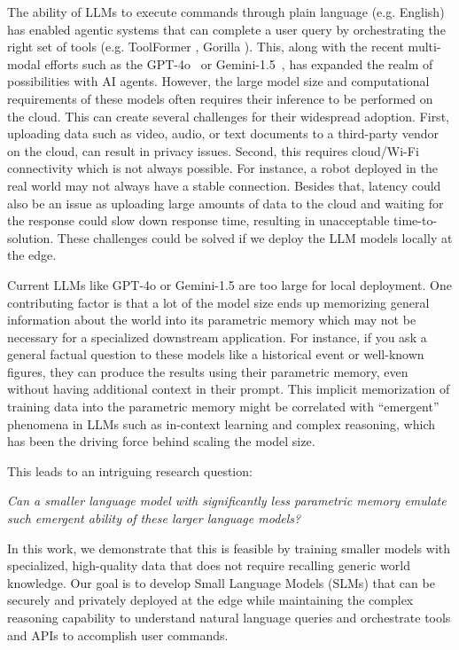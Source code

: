 The ability of LLMs to execute commands through plain language (e.g. English) has enabled agentic systems that can complete a user query by orchestrating the right set of tools (e.g. ToolFormer \cite{schick2024toolformer}, Gorilla \cite{patil2023gorilla}). This, along with the recent multi-modal efforts such as the GPT-4o~\cite{openai_gpt4o} or Gemini-1.5~\cite{google_gemini_2024}, has expanded the realm of possibilities with AI agents. 
However, the large model size and computational requirements of these models often requires their inference to be performed on the cloud. This can create several challenges for their widespread adoption.
First, uploading data such as video, audio, or text documents to a third-party vendor on the cloud, can result in privacy issues. Second, this requires cloud/Wi-Fi connectivity which is not always possible. For instance, a robot deployed in the real world may not always have a stable connection. Besides that, latency could also be an issue as uploading large amounts of data to the cloud and waiting for the response could slow down response time, resulting in unacceptable time-to-solution. These challenges could be solved if we deploy the LLM models locally at the edge.

Current LLMs like GPT-4o \cite{openai_gpt4o} or Gemini-1.5 \cite{google_gemini_2024} are too large for local deployment. One contributing factor is that a lot of the model size ends up memorizing general information about the world into its parametric memory which may not be necessary for a specialized downstream application.
For instance, if you ask a general factual question to these models like a historical event or well-known figures, they can produce the results using their parametric memory, even without having additional context in their prompt. 
This implicit memorization of training data into the parametric memory might be correlated with “emergent” phenomena in LLMs such as in-context learning and complex reasoning, which has been the driving force behind scaling the model size. 

This leads to an intriguing research question:

\textit{Can a smaller language model with significantly less parametric memory emulate such emergent ability of these larger language models?}

In this work, we demonstrate that this is feasible by training smaller models with specialized, high-quality data that does not require recalling generic world knowledge. 
Our goal is to develop Small Language Models (SLMs) that can be securely and privately deployed at the edge while maintaining the complex reasoning capability to understand natural language queries and orchestrate tools and APIs to accomplish user commands.

